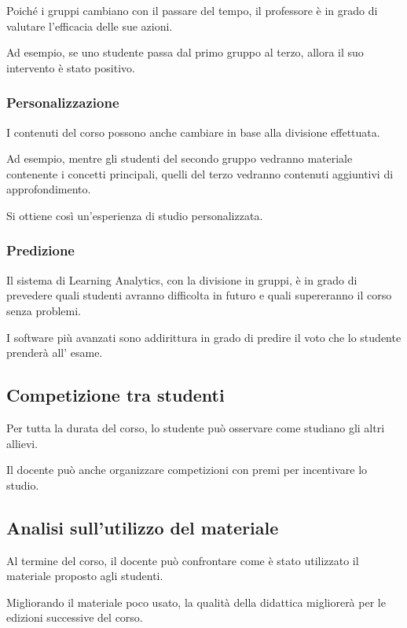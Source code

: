 Poiché i gruppi cambiano con il passare del tempo, il professore è in grado di valutare l'efficacia delle sue azioni.

Ad esempio, se uno studente passa dal primo gruppo al terzo, allora il suo intervento è stato positivo.

\subsubsection{Personalizzazione}

I contenuti del corso possono anche cambiare in base alla divisione effettuata.

Ad esempio, mentre gli studenti del secondo gruppo vedranno materiale contenente i concetti principali, quelli del terzo vedranno contenuti aggiuntivi di approfondimento.

Si ottiene così un'esperienza di studio personalizzata.

\subsubsection{Predizione}

Il sistema di Learning Analytics, con la divisione in gruppi, è in grado di prevedere quali studenti avranno difficolta in futuro e quali supereranno il corso senza problemi.

I software più avanzati sono addirittura in grado di predire il voto che lo studente prenderà all' esame. 

\subsection{Competizione tra studenti}

Per tutta la durata del corso, lo studente può osservare come studiano gli altri allievi.

Il docente può anche organizzare competizioni con premi per incentivare lo studio.

\subsection{Analisi sull'utilizzo del materiale}

Al termine del corso, il docente può confrontare come è stato utilizzato il materiale proposto agli studenti.

Migliorando il materiale poco usato, la qualità della didattica migliorerà per le edizioni successive del corso.

